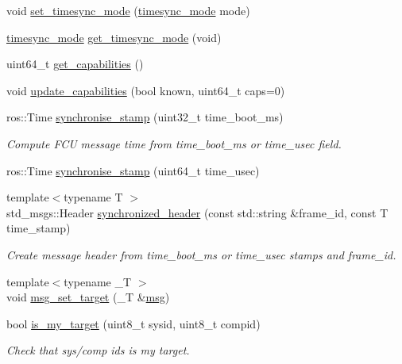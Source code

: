 \begin{DoxyCompactItemize}
\item 
void \mbox{\hyperlink{group__nodelib_gafd550e12066507238346b5cf4814d688}{set\+\_\+timesync\+\_\+mode}} (\mbox{\hyperlink{group__mavutils_gac7f53712a7627f397d0eb145c2a16cf7}{timesync\+\_\+mode}} mode)
\item 
\mbox{\hyperlink{group__mavutils_gac7f53712a7627f397d0eb145c2a16cf7}{timesync\+\_\+mode}} \mbox{\hyperlink{group__nodelib_ga2284947568b4a2205a500d8c494ae7fa}{get\+\_\+timesync\+\_\+mode}} (void)
\item 
uint64\+\_\+t \mbox{\hyperlink{group__nodelib_ga11f231ebf1dcdf015466ecec477c5795}{get\+\_\+capabilities}} ()
\item 
void \mbox{\hyperlink{group__nodelib_ga6e1867e65586363b66cc274a970c0660}{update\+\_\+capabilities}} (bool known, uint64\+\_\+t caps=0)
\item 
ros\+::\+Time \mbox{\hyperlink{group__nodelib_ga0fefb6563eb4fdd64b7b3ee2898f786e}{synchronise\+\_\+stamp}} (uint32\+\_\+t time\+\_\+boot\+\_\+ms)
\begin{DoxyCompactList}\small\item\em Compute F\+CU message time from time\+\_\+boot\+\_\+ms or time\+\_\+usec field. \end{DoxyCompactList}\item 
ros\+::\+Time \mbox{\hyperlink{group__nodelib_ga12c99ff6a2e51345ad813086f79bb2c1}{synchronise\+\_\+stamp}} (uint64\+\_\+t time\+\_\+usec)
\item 
{\footnotesize template$<$typename T $>$ }\\std\+\_\+msgs\+::\+Header \mbox{\hyperlink{group__nodelib_ga548327e4a73268424eb8a730be7e618d}{synchronized\+\_\+header}} (const std\+::string \&frame\+\_\+id, const T time\+\_\+stamp)
\begin{DoxyCompactList}\small\item\em Create message header from time\+\_\+boot\+\_\+ms or time\+\_\+usec stamps and frame\+\_\+id. \end{DoxyCompactList}\item 
{\footnotesize template$<$typename \+\_\+T $>$ }\\void \mbox{\hyperlink{group__nodelib_ga1fb94a2e20412126b42bcb872a7d0845}{msg\+\_\+set\+\_\+target}} (\+\_\+T \&\mbox{\hyperlink{stratnode_8cpp_a82cfe4ed9bc9e1b07c8bf209c324d85b}{msg}})
\item 
bool \mbox{\hyperlink{group__nodelib_ga1ed3e59972054c99c9c5d7205bdbe3bc}{is\+\_\+my\+\_\+target}} (uint8\+\_\+t sysid, uint8\+\_\+t compid)
\begin{DoxyCompactList}\small\item\em Check that sys/comp id\textquotesingle{}s is my target. \end{DoxyCompactList}\item 

\end{DoxyCompactItemize}
